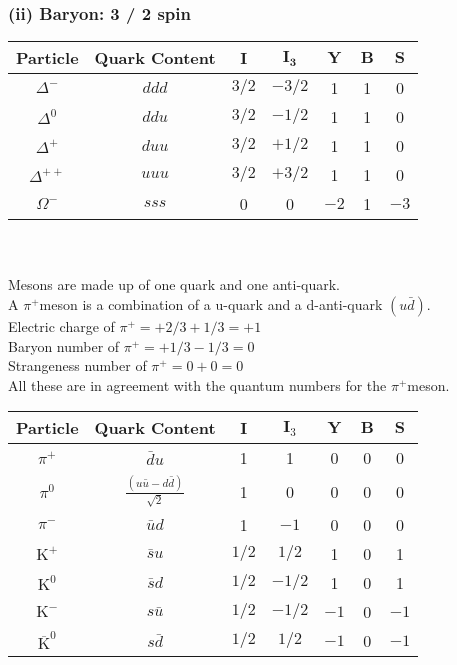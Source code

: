 \subsubsection{(ii) Baryon: 3 / 2 spin}
\begin{tabular}{|c|c|c|c|c|c|c|}
	\hline Particle & Quark Content & $\mathbf{I}$ & $\mathbf{I}_{\mathbf{3}}$ & $\mathbf{Y}$ & $\mathbf{B}$ & $\mathbf{S}$ \\
	\hline$\Delta^{-}$ & $d d d$ & $3 / 2$ & $-3 / 2$ & 1 & 1 & 0 \\
	\hline$\Delta^0$ & $d d u$ & $3 / 2$ & $-1 / 2$ & 1 & 1 & 0 \\
	\hline$\Delta^{+}$ & $d u u$ & $3 / 2$ & $+1 / 2$ & 1 & 1 & 0 \\
	\hline$\Delta^{++}$ & $u u u$ & $3 / 2$ & $+3 / 2$ & 1 & 1 & 0 \\
	\hline$\Omega^{-}$ & $s s s$ & 0 & 0 & $-2$ & 1 & $-3$ \\
	\hline
\end{tabular}\\\\
Mesons are made up of one quark and one anti-quark.\\
A $\pi^{+}$meson is a combination of a u-quark and a d-anti-quark $(u \bar{d})$.\\
Electric charge of $\pi^{+}=+2 / 3+1 / 3=+1$\\
Baryon number of $\pi^{+}=+1 / 3-1 / 3=0$\\
Strangeness number of $\pi^{+}=0+0=0$\\
All these are in agreement with the quantum numbers for the $\pi^{+}$meson.\\
\renewcommand*{\arraystretch}{1.5}
\begin{tabular}{|c|c|c|c|c|c|c|}
	\hline Particle & Quark Content & $\mathbf{I}$ & $\mathbf{I}_3$ & $\mathbf{Y}$ & $\mathbf{B}$ & $\mathbf{S}$ \\
	\hline$\pi^{+}$ & $\bar{d} u$ & 1 & 1 & 0 & 0 & 0 \\
	\hline$\pi^0$ & $\frac{(u \bar{u}-d \bar{d})}{\sqrt{2}}$ & 1 & 0 & 0 & 0 & 0 \\
		\hline$\pi^{-}$ & $\bar{u} d$ & 1 & $-1$ & 0 & 0 & 0 \\
		\hline $\mathrm{K}^{+}$ & $\bar{s} u$ & $1 / 2$ & $1 / 2$ & 1 & 0 & 1 \\
		\hline $\mathrm{K}^0$ & $\bar{s} d$ & $1 / 2$ & $-1 / 2$ & 1 & 0 & 1 \\
		\hline $\mathrm{K}^{-}$ & $s \bar{u}$ & $1 / 2$ & $-1 / 2$ & $-1$ & 0 & $-1$ \\
		\hline$\overline{\mathrm{K}}^0$ & $s \bar{d}$ & $1 / 2$ & $1 / 2$ & $-1$ & 0 & $-1$ \\\hline
\end{tabular}
